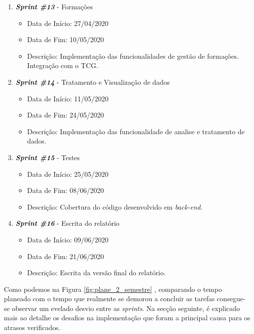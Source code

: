 \begin{enumerate}
\begin{itemize}
	\end{itemize}
	\item \textit{\textbf{Sprint \#13}} - Formações
	\begin{itemize}
		\item Data de Início: 27/04/2020
		\item Data de Fim: 10/05/2020
		\item Descrição: Implementação das funcionalidades de gestão de formações. Integração com o TCG.
	\end{itemize}
	\item \textit{\textbf{Sprint \#14}} - Tratamento e Visualização de dados
	\begin{itemize}
		\item Data de Início: 11/05/2020
		\item Data de Fim: 24/05/2020
		\item Descrição: Implementação das funcionalidade de analise e tratamento de dados. 
	\end{itemize}
	\item \textit{\textbf{Sprint \#15}} - Testes
	\begin{itemize}
		\item Data de Início: 25/05/2020
		\item Data de Fim: 08/06/2020
		\item Descrição: Cobertura do código desenvolvido em \textit{back-end}.
	\end{itemize}
	\item \textit{\textbf{Sprint \#16}} - Escrita do relatório
	\begin{itemize}
		\item Data de Início: 09/06/2020
		\item Data de Fim: 21/06/2020
		\item Descrição: Escrita da versão final do relatório.
	\end{itemize}
\end{enumerate}

Como podemos na Figura \ref{fig:plane_2_semestre} , comparando o tempo planeado com o tempo que realmente se demorou a concluir as tarefas consegue-se observar um evelado desvio entre as \textit{sprints}. Na secção seguinte, é explicado mais ao detalhe os desafios na implementação que foram a principal causa para os atrasos verificados.


